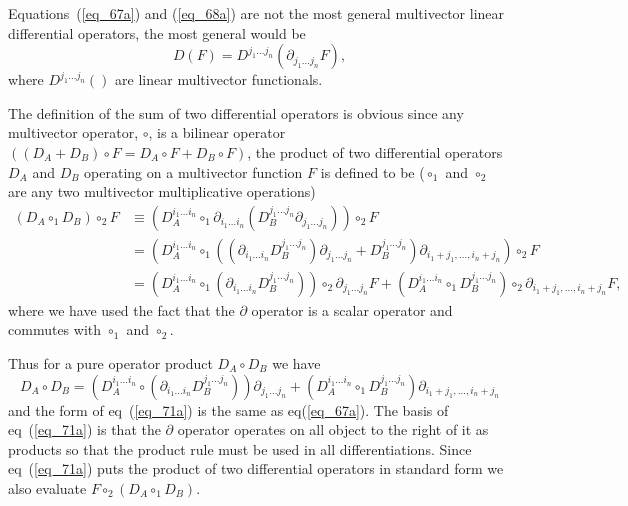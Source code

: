 \documentclass[12pt]{report}
\newcommand{\lp}{\left (}
\newcommand{\rp}{\right )}
\newcommand{\f}[2]{{#1}\lp {#2} \rp}
\newcommand{\paren}[1]{\lp {#1} \rp}
\newcommand{\be}{\begin{equation}}
\newcommand{\ee}{\end{equation}}
\begin{document}
Equations~(\ref{eq_67a}) and (\ref{eq_68a}) are not the most general multivector linear differential operators, the most general would be
\be
	\f{D}{F} = \f{D^{j_{1}\dots j_{n}}}{\partial_{j_{1}\dots j_{n}}F},
\ee
where $\f{D^{j_{1}\dots j_{n}}}{}$ are linear multivector functionals.

The definition of the sum of two differential operators is obvious since any multivector operator, $\circ$, is a bilinear operator 
$\paren{\paren{D_{A}+D_{B}}\circ F = D_{A}\circ F+D_{B}\circ F}$, the product of two differential operators $D_{A}$ and $D_{B}$ operating on a multivector function $F$ is defined to be ($\circ_{1}$ and $\circ_{2}$ are any two multivector multiplicative operations)
\begin{align*}
	\paren{D_{A}\circ_{1}D_{B}}\circ_{2}F &\equiv \paren{D_{A}^{i_{1}\dots i_{n}}\circ_{1}
	                                              \partial_{i_{1}\dots i_{n}}\paren{D_{B}^{j_{1}\dots j_{n}}
	                                              \partial_{j_{1}\dots j_{n}}}}\circ_{2}F \nonumber \\
	                                      &= \paren{D_{A}^{i_{1}\dots i_{n}}\circ_{1}
	                                         \paren{\paren{\partial_{i_{1}\dots i_{n}}D_{B}^{j_{1}\dots j_{n}}}
	                                         \partial_{j_{1}\dots j_{n}}+
	                                         D_{B}^{j_{1}\dots j_{n}}}
	                                         \partial_{i_{1}+j_{1},\dots, i_{n}+j_{n}}}\circ_{2}F \nonumber \\
	                                      &= \paren{D_{A}^{i_{1}\dots i_{n}}\circ_{1}\paren{\partial_{i_{1}\dots i_{n}}D_{B}^{j_{1}\dots j_{n}}}}
	                                         \circ_{2}\partial_{j_{1}\dots j_{n}}F+	                                         
	                                         \paren{D_{A}^{i_{1}\dots i_{n}}\circ_{1}D_{B}^{j_{1}\dots j_{n}}}
	                                         \circ_{2}\partial_{i_{1}+j_{1},\dots, i_{n}+j_{n}}F,
\end{align*}
where we have used the fact that the $\partial$ operator is a scalar operator and commutes with $\circ_{1}$ and $\circ_{2}$.

Thus for a pure operator product $D_{A}\circ D_{B}$ we have
\be\label{eq_71a}
	D_{A}\circ D_{B} = \paren{D_{A}^{i_{1}\dots i_{n}}\circ\paren{\partial_{i_{1}\dots i_{n}}D_{B}^{j_{1}\dots j_{n}}}}
	                                         \partial_{j_{1}\dots j_{n}}+	                                         
	                                         \paren{D_{A}^{i_{1}\dots i_{n}}\circ_{1}D_{B}^{j_{1}\dots j_{n}}}
	                                         \partial_{i_{1}+j_{1},\dots, i_{n}+j_{n}}
\ee
and the form of eq~(\ref{eq_71a}) is the same as eq(\ref{eq_67a}).  The basis of eq~(\ref{eq_71a}) is that the $\partial$ operator
operates on all object to the right of it as products so that the product rule must be used in all differentiations.  Since eq~(\ref{eq_71a})
puts the product of two differential operators in standard form we also evaluate $F\circ_{2}\paren{D_{A}\circ_{1}D_{B}}$.
\end{document}
